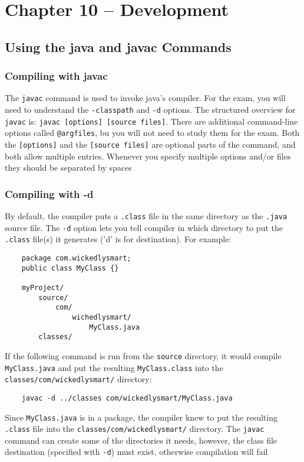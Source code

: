 \section{Chapter 10 -- Development}
\subsection{Using the java and javac Commands}
\subsubsection{Compiling with javac}
The \verb#javac# command is used to invoke java's compiler. For the exam, you 
will need to understand the \verb#-classpath# and \verb#-d# options. The 
structured overview for \verb#javac# is: \verb#javac [options] [source files]#.
There are additional command-line options called \verb#@argfiles#, bu you will 
not need to study them for the exam. Both the \verb#[options]# and the 
\verb#[source files]# are optional parts of the command, and both allow 
multiple entries. Whenever you specify multiple options and/or files they 
should be separated by spaces

\subsubsection{Compiling with -d}
By default, the compiler puts a \verb#.class# file in the same directory as the 
\verb#.java# source file. The \verb#-d# option lets you tell compiler in which 
directory to put the \verb#.class# file(s) it generates ('d' is for 
destination). For example:
\begin{verbatim}
    package com.wickedlysmart;
    public class MyClass {}

    myProject/
        source/
            com/
                wichedlysmart/
                    MyClass.java
        classes/
\end{verbatim}
If the following command is run from the \verb#source# directory, it would 
compile \verb#MyClass.java# and put the resulting \verb#MyClass.class# into the 
\verb#classes/com/wickedlysmart/# directory:
\begin{verbatim}
    javac -d ../classes com/wickedlysmart/MyClass.java
\end{verbatim}
Since \verb#MyClass.java# is in a package, the compiler knew to put the 
resulting \verb#.class# file into the \verb#classes/com/wickedlysmart/# 
directory. The \verb#javac# command can create some of the directories it 
needs, however, the class file destination (specified with \verb#-d#) must 
exist, otherwise compilation will fail

